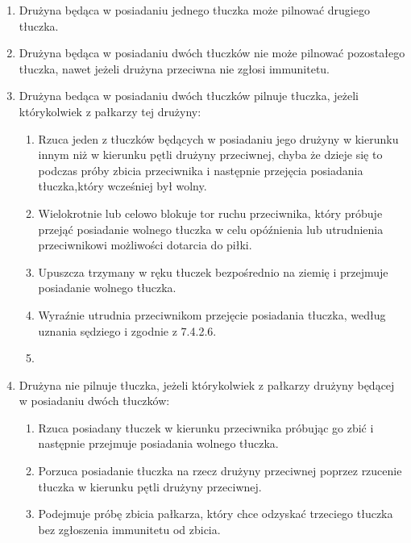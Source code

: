 \documentclass[12pt]{article}
\begin{document}
\begin{enumerate}
	\item
	      Drużyna będąca w posiadaniu jednego tłuczka może pilnować drugiego
	      tłuczka.
	\item
	      Drużyna będąca w posiadaniu dwóch tłuczków nie może pilnować
	      pozostałego tłuczka, nawet jeżeli drużyna przeciwna nie zgłosi
	      immunitetu.
	\item
	      Drużyna bedąca w posiadaniu dwóch tłuczków pilnuje tłuczka, jeżeli
	      którykolwiek z pałkarzy tej drużyny:

	      \begin{enumerate}
		      \item
		            Rzuca jeden z tłuczków będących w posiadaniu jego drużyny w kierunku
		            innym niż w kierunku pętli drużyny przeciwnej, chyba że dzieje się
		            to podczas próby zbicia przeciwnika i następnie przejęcia posiadania
		            tłuczka,który wcześniej był wolny.
		      \item
		            Wielokrotnie lub celowo blokuje tor ruchu przeciwnika, który próbuje
		            przejąć posiadanie wolnego tłuczka w celu opóźnienia lub utrudnienia
		            przeciwnikowi możliwości dotarcia do piłki.
		      \item
		            Upuszcza trzymany w ręku tłuczek bezpośrednio na ziemię i przejmuje
		            posiadanie wolnego tłuczka.
		      \item
		            Wyraźnie utrudnia przeciwnikom przejęcie posiadania tłuczka, według
		            uznania sędziego i zgodnie z 7.4.2.6.\item
	      \end{enumerate}
	\item
	      Drużyna nie pilnuje tłuczka, jeżeli którykolwiek z pałkarzy drużyny
	      będącej w posiadaniu dwóch tłuczków:

	      \begin{enumerate}
		      \item
		            Rzuca posiadany tłuczek w kierunku przeciwnika próbując go zbić i
		            następnie przejmuje posiadania wolnego tłuczka.
		      \item
		            Porzuca posiadanie tłuczka na rzecz drużyny przeciwnej poprzez
		            rzucenie tłuczka w kierunku pętli drużyny przeciwnej.
		      \item
		            Podejmuje próbę zbicia pałkarza, który chce odzyskać trzeciego
		            tłuczka bez zgłoszenia immunitetu od zbicia.
	      \end{enumerate}
\end{enumerate}
\end{document}
